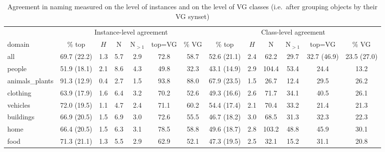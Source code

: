 \begin{table}
\footnotesize
\begin{tabular}{p{1.3cm}cccccc|cccccc}
\toprule
 & \multicolumn{6}{c|}{Instance-level agreement} & \multicolumn{6}{c}{Class-level agreement}\\ 
           domain & \% top &    $H$ &    N & N$_{>1}$ & top=VG &  \% VG & \% top &    $H$ &     N & N$_{>1}$ & top=VG &  \% VG \\
\midrule
            all &  69.7 (22.2) &  1.3 &  5.7 &   2.9 &  72.8  &  58.7  &   52.6 (21.1) &  2.4 &   62.2 &  29.7 &  32.7 (46.9) &  23.5 (27.0)  \\
 \midrule
         people &  51.9 (18.1) &  2.1 &  8.6 &   4.3 &         49.8 &         32.3 &     43.1 (14.9) &  2.9 &  104.4 &  53.4 &         24.4 &         13.2  \\
 animals\_plants &  91.3 (12.9) &  0.4 &  2.7 &   1.5 &         93.8 &         88.0 &     67.9 (23.5) &  1.5 &   26.7 &  12.4 &         29.5 &         26.2  \\
       clothing &  63.9 (17.9) &  1.6 &  6.4 &   3.2 &         70.2 &         52.6 &     49.3 (16.6) &  2.6 &   71.7 &  34.1 &         40.5 &         26.1  \\
       vehicles &  72.0 (19.5) &  1.1 &  4.7 &   2.4 &         71.1 &         60.2 &    54.4 (17.4) &  2.1 &   70.4 &  33.2 &         21.4 &         21.3  \\
      buildings &  66.9 (20.5) &  1.5 &  6.9 &   3.0 &         72.6 &         55.5 &      46.7 (18.2) &  3.0 &   68.5 &  31.3 &         32.3 &         22.3  \\
           home &  66.4 (20.5) &  1.5 &  6.3 &   3.1 &         78.5 &         58.8 &     49.6 (18.7) &  2.8 &  103.2 &  48.8 &         45.9 &         30.1  \\
           food &  71.3 (21.1) &  1.3 &  5.5 &   2.9 &         62.9 &         52.1 &     47.3 (19.5) &  2.5 &   32.1 &  15.2 &         31.1 &         20.8  \\
\bottomrule
\end{tabular}\caption{Agreement in naming measured on the level of instances and on the level of VG classes (i.e.\ after grouping objects by their VG synset) }
\label{tab:agree}
\end{table}




